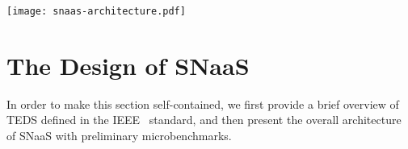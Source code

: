 \documentclass[conference]{IEEEtran}
\begin{document}
\begin{figure*}[p]
\begin{center}
\texttt{[image: snaas-architecture.pdf]}
\end{center}
\vspace{-5mm}
\caption{\textbf{SNaaS architecture and workflow.}}
\label{fig:snaas-architecture}
\end{figure*}

\section{The Design of SN\lowercase{aa}S}\label{sec:snaas}
In order to make this section self-contained, we first provide a brief overview of TEDS defined in the IEEE~ standard, and then present the overall architecture of SNaaS with preliminary microbenchmarks.
\end{document}
